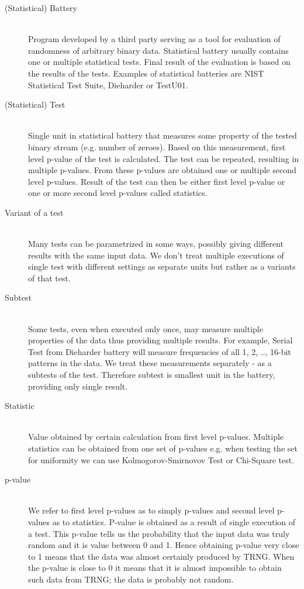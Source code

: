 \documentclass[
  digital,  	%
  color,		%
  oneside,   	%
  12pt,
  nocover,
  notable,
  nolof,
  nolot,
]{fithesis3}
\begin{document}
\begin{description}
\item[(Statistical) Battery] \hfill \\
Program developed by a third party serving as a tool for evaluation of randomness of arbitrary binary data. Statistical battery usually contains one or multiple statistical tests. Final result of the evaluation is based on the results of the tests. Examples of statistical batteries are NIST Statistical Test Suite, Dieharder or TestU01.

\item[(Statistical) Test] \hfill \\
Single unit in statistical battery that measures some property of the tested binary stream (e.g. number of zeroes). Based on this measurement, first level p-value of the test is calculated. The test can be repeated, resulting in multiple p-values. From these p-values are obtained one or multiple second level p-values. Result of the test can then be either first level p-value or one or more second level p-values called statistics.

\item[Variant of a test] \hfill \\
Many tests can be parametrized in some ways, possibly giving different results with the same input data. We don't treat multiple executions of single test with different settings as separate units but rather as a variants of that test.

\item[Subtest] \hfill \\
Some tests, even when executed only once, may measure multiple properties of the data thus providing multiple results. For example, Serial Test from Dieharder battery will measure frequencies of all 1, 2, .., 16-bit patterns in the data. We treat these measurements separately - as a subtests of the test. Therefore subtest is smallest unit in the battery, providing only single result.

\item[Statistic] \hfill \\
Value obtained by certain calculation from first level p-values. Multiple statistics can be obtained from one set of p-values e.g. when testing the set for uniformity we can use Kolmogorov-Smirnovov Test or Chi-Square test.

\item[p-value] \hfill \\
We refer to first level p-values as to simply p-values and second level p-values as to statistics. P-value is obtained as a result of single execution of a test. This p-value tells us the probability that the input data was truly random and it is value between 0 and 1. Hence obtaining p-value very close to 1 means that the data was almost certainly produced by TRNG. When the p-value is close to 0 it means that it is almost impossible to obtain such data from TRNG; the data is probably not random.


\end{description}
\end{document}
